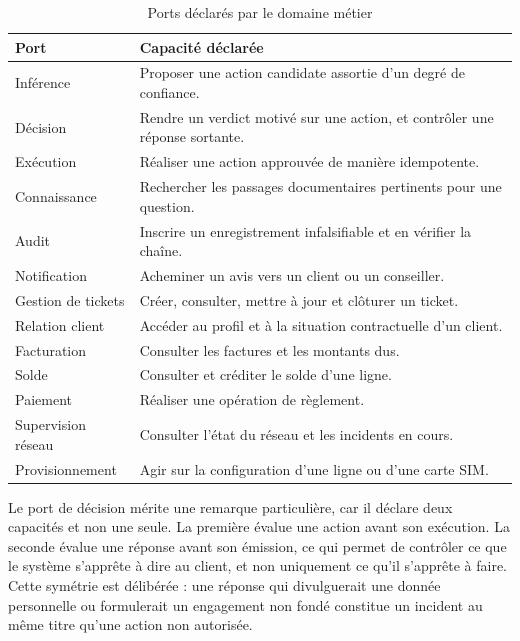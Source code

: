 \begin{table}[H]
\centering
\renewcommand{\arraystretch}{1.2}
\begin{tabular}{|p{3.0cm}|p{11.5cm}|}
\hline
\textbf{Port} & \textbf{Capacité déclarée} \\
\hline
Inférence & Proposer une action candidate assortie d'un degré de confiance. \\
\hline
Décision & Rendre un verdict motivé sur une action, et contrôler une réponse sortante. \\
\hline
Exécution & Réaliser une action approuvée de manière idempotente. \\
\hline
Connaissance & Rechercher les passages documentaires pertinents pour une question. \\
\hline
Audit & Inscrire un enregistrement infalsifiable et en vérifier la chaîne. \\
\hline
Notification & Acheminer un avis vers un client ou un conseiller. \\
\hline
Gestion de tickets & Créer, consulter, mettre à jour et clôturer un ticket. \\
\hline
Relation client & Accéder au profil et à la situation contractuelle d'un client. \\
\hline
Facturation & Consulter les factures et les montants dus. \\
\hline
Solde & Consulter et créditer le solde d'une ligne. \\
\hline
Paiement & Réaliser une opération de règlement. \\
\hline
Supervision réseau & Consulter l'état du réseau et les incidents en cours. \\
\hline
Provisionnement & Agir sur la configuration d'une ligne ou d'une carte SIM. \\
\hline
\end{tabular}
\caption{Ports déclarés par le domaine métier}
\label{tab:ports}
\end{table}

Le port de décision mérite une remarque particulière, car il déclare deux capacités et non une seule. La première évalue une action avant son exécution. La seconde évalue une réponse avant son émission, ce qui permet de contrôler ce que le système s'apprête à dire au client, et non uniquement ce qu'il s'apprête à faire. Cette symétrie est délibérée : une réponse qui divulguerait une donnée personnelle ou formulerait un engagement non fondé constitue un incident au même titre qu'une action non autorisée.

